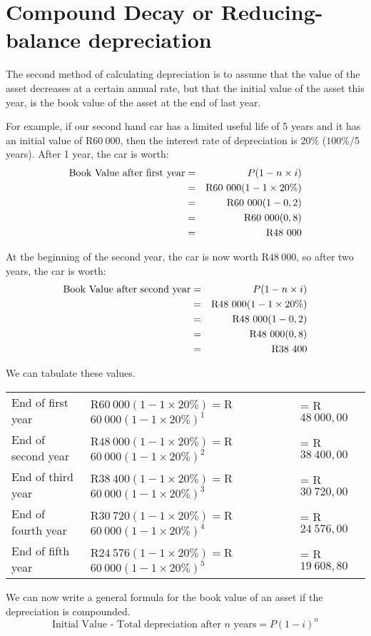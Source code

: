 \section{Compound Decay or Reducing-balance depreciation}
The second method of calculating depreciation is to assume that the value of the asset decreases at a certain annual rate, but that the initial value of the asset this year, is the book value of the asset at the end of last year.

For example, if our second hand car has a limited useful life of 5 years and it has an initial value of R$60~000$, then the interest rate of depreciation is $20\%$ ($100\%$/5 years). After 1 year, the car is worth:
\begin{eqnarray*}
\mbox{Book Value after first year} &=& P(1-n\times i)\\
&=&\rm{R}60~000(1-1\times 20\%)\\
&=&\rm{R}60~000(1-0,2)\\
&=&\rm{R}60~000(0,8)\\
&=&\rm{R}48~000
\end{eqnarray*}

At the beginning of the second year, the car is now worth R$48~000$, so after two years, the car is worth:
\begin{eqnarray*}
\mbox{Book Value after second year} &=& P(1-n\times i)\\
&=&\rm{R}48~000(1-1\times 20\%)\\
&=&\rm{R}48~000(1-0,2)\\
&=&\rm{R}48~000(0,8)\\
&=&\rm{R}38~400
\end{eqnarray*}

We can tabulate these values.
\begin{center}
\begin{tabular}{lll}
End of first year&R$60~000(1-1\times20\%)=$R$60~000(1-1\times20\%)^1$ &= R$48~000,00$\\
End of second year&R$48~000(1-1\times20\%)=$R$60~000(1-1\times20\%)^2$&= R$38~400,00$\\
End of third year&R$38~400(1-1\times20\%)=$R$60~000(1-1\times20\%)^3$&= R$30~720,00$\\
End of fourth year&R$30~720(1-1\times20\%)=$R$60~000(1-1\times20\%)^4$&= R$24~576,00$\\
End of fifth year&R$24~576(1-1\times20\%)=$R$60~000(1-1\times20\%)^5$&= R$19~608,80$\\
\end{tabular}
\end{center}
We can now write a general formula for the book value of an asset if the depreciation is compounded.
\begin{equation}
\mbox{Initial Value - Total depreciation after $n$ years} = P(1-i)^n
\end{equation}

